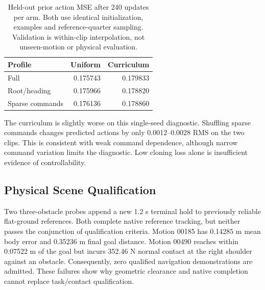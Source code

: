 \documentclass[10pt,twocolumn]{article}
\begin{document}
\begin{table}[t]
\centering\small
\begin{tabular}{lrr}\toprule
Profile & Uniform & Curriculum\\\midrule
Full & 0.175743 & 0.179833\\
Root/heading & 0.175966 & 0.178820\\
Sparse commands & 0.176136 & 0.178860\\\bottomrule
\end{tabular}
\caption{Held-out prior action MSE after 240 updates per arm. Both use identical initialization, examples and reference-quarter sampling. Validation is within-clip interpolation, not unseen-motion or physical evaluation.}
\end{table}
The curriculum is slightly worse on this single-seed diagnostic. Shuffling sparse commands changes predicted actions by only 0.0012--0.0028 RMS on the two clips. This is consistent with weak command dependence, although narrow command variation limits the diagnostic. Low cloning loss alone is insufficient evidence of controllability.

\subsection{Physical Scene Qualification}
Two three-obstacle probes append a new 1.2 s terminal hold to previously reliable flat-ground references. Both complete native reference tracking, but neither passes the conjunction of qualification criteria. Motion 00185 has 0.14285 m mean body error and 0.35236 m final goal distance. Motion 00490 reaches within 0.07522 m of the goal but incurs 352.46 N normal contact at the right shoulder against an obstacle. Consequently, zero qualified navigation demonstrations are admitted. These failures show why geometric clearance and native completion cannot replace task/contact qualification.
\end{document}
